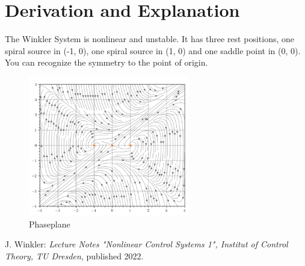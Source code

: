 \documentclass[10pt,a4paper]{article}
\begin{document}
	\section{Derivation and Explanation} %
	The Winkler System is nonlinear and unstable. It has three rest positions, one spiral source in (-1, 0), one spiral source in (1, 0) and one saddle point in (0, 0). You can recognize the symmetry to the point of origin. 
	\begin{figure}[H]
		\centering
		\includegraphics[width=70mm]{winkler_pp.pdf}
		\caption{Phaseplane}
	\end{figure}
	
	
	\begin{thebibliography}{10}		
		J. Winkler:
		\textit{Lecture Notes "Nonlinear Control Systems 1", Institut of Control Theory, TU Dresden}, published 2022.
	\end{thebibliography}
\end{document}
